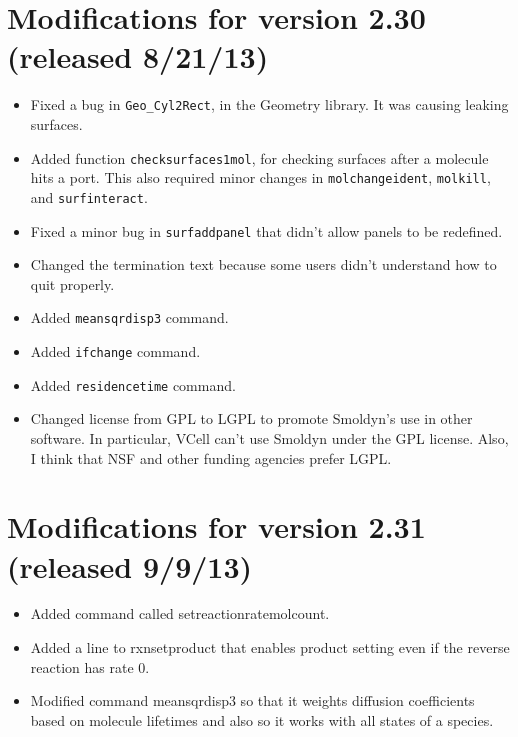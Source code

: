 \documentclass {scrbook}
\newcommand {\ttt} {\texttt}
\begin{document}
\section{Modifications for version 2.30 (released 8/21/13)}
\begin{itemize}
\item Fixed a bug in \ttt{Geo\_Cyl2Rect}, in the Geometry library. It was causing leaking surfaces.
\item Added function \ttt{checksurfaces1mol}, for checking surfaces after a molecule hits a port. This also required minor changes in \ttt{molchangeident}, \ttt{molkill}, and \ttt{surfinteract}.
\item Fixed a minor bug in \ttt{surfaddpanel} that didn't allow panels to be redefined.
\item Changed the termination text because some users didn't understand how to quit properly.
\item Added \ttt{meansqrdisp3} command.
\item Added \ttt{ifchange} command.
\item Added \ttt{residencetime} command.
\item Changed license from GPL to LGPL to promote Smoldyn's use in other software. In particular, VCell can't use Smoldyn under the GPL license. Also, I think that NSF and other funding agencies prefer LGPL.
\end{itemize}

\section{Modifications for version 2.31 (released 9/9/13)}
\begin{itemize}
\item Added command called setreactionratemolcount.
\item Added a line to rxnsetproduct that enables product setting even if the reverse reaction has rate 0.
\item Modified command meansqrdisp3 so that it weights diffusion coefficients based on molecule lifetimes and also so it works with all states of a species.
\end{itemize}
\end{document}
